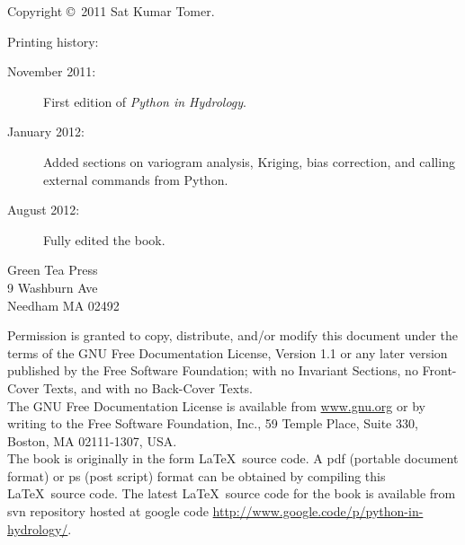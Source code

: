 \documentclass[10pt]{book}
\begin{document}
\begin{latexonly}
\begin{flushright}
\vspace{0.5in}

\vfill




\end{flushright}


\pagebreak
\thispagestyle{empty}

{\small
Copyright \copyright ~2011 Sat Kumar Tomer.


Printing history:

\begin{description}

\item[November 2011:] First edition of {\em Python in Hydrology}.
\item[January 2012:] Added sections on variogram analysis, Kriging, bias correction, and calling external commands from Python. 
\item[August 2012:] Fully edited the book.
\end{description}

\vspace{0.2in}

\begin{flushleft}
Green Tea Press       \\
9 Washburn Ave \\
Needham MA 02492
\end{flushleft}

Permission is granted to copy, distribute, and/or modify this document
under the terms of the GNU Free Documentation License, Version 1.1 or
any later version published by the Free Software Foundation; with no
Invariant Sections, no Front-Cover Texts, and with no Back-Cover Texts. \\

The GNU Free Documentation License is available from \url{www.gnu.org}
or by writing to the Free Software Foundation, Inc., 59 Temple Place,
Suite 330, Boston, MA 02111-1307, USA. \\ 

The book is originally in the form \LaTeX\ source code. 
A pdf (portable document format) or ps (post script) format can be obtained 
by compiling this \LaTeX\ source code. The latest \LaTeX\ source code for the 
book is available from svn repository hosted at google code 
\url{http://www.google.code/p/python-in-hydrology/}. 

\vspace{0.2in}

} %

\end{latexonly}
\end{document}
